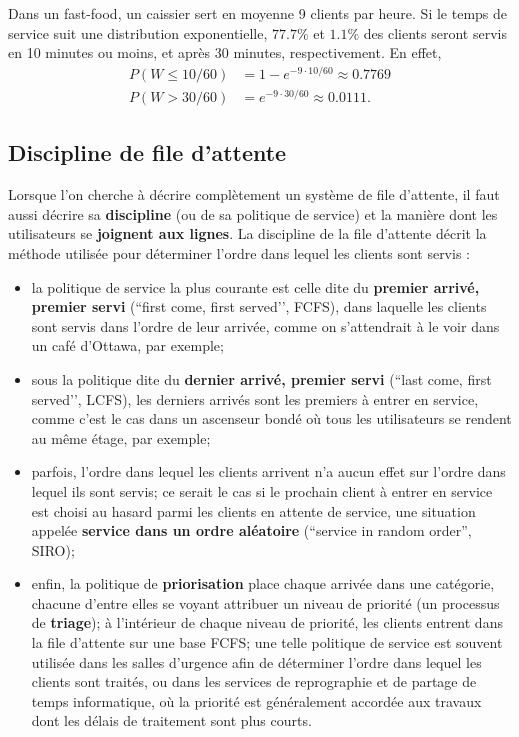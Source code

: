\begin{Example}
 Dans un fast-food, un caissier sert en moyenne 9 clients par heure. Si le temps de service suit une distribution exponentielle, $77.7\%$ et $1.1\%$ des clients seront servis en 10 minutes ou moins, et après 30 minutes, respectivement. En effet, \begin{align*}P(W\leq 10/60)&=1-e^{-9 \cdot 10/60} \approx 0.7769\\ P(W>30/60)&=e^{-9\cdot 30/60}\approx 0.0111.\end{align*}
\end{Example}

\subsection{Discipline de file d'attente}
Lorsque l’on cherche à décrire complètement un système de file d'attente, il faut aussi décrire sa \textbf{discipline} (ou de sa politique de service) et la manière dont les utilisateurs se  \textbf{joignent aux lignes}. La discipline de la file d'attente décrit la méthode utilisée pour déterminer l'ordre dans lequel les clients sont servis : 
\begin{itemize}
\item la politique de service la plus courante est celle dite du \textbf{premier arrivé, premier servi} (``first come, first served’’, FCFS), dans laquelle les clients sont servis dans l'ordre de leur arrivée, comme on s'attendrait à le voir dans un café d’Ottawa, par exemple;
\item sous la politique dite du \textbf{dernier arrivé, premier servi} (``last come, first served’’, LCFS), les derniers arrivés sont les premiers à entrer en service, comme c’est le cas dans un ascenseur bondé où tous les utilisateurs se rendent au même étage, par exemple;
\item parfois, l'ordre dans lequel les clients arrivent n'a aucun effet sur l'ordre dans lequel ils sont servis; ce serait le cas si le prochain client à entrer en service est choisi au hasard parmi les clients en attente de service, une situation appelée \textbf{service dans un ordre aléatoire} (``service in random order'', SIRO); 
\item enfin, la politique de \textbf{priorisation} place chaque arrivée dans une catégorie, chacune d'entre elles se voyant attribuer un niveau de priorité (un processus de \textbf{triage}); à l'intérieur de chaque niveau de priorité, les clients entrent dans la file d'attente sur une base FCFS; une telle politique de service est souvent utilisée dans les salles d'urgence afin de déterminer l'ordre dans lequel les clients sont traités, ou dans les services de reprographie et de partage de temps informatique, où la priorité est généralement accordée aux travaux dont les délais de traitement sont plus courts.
\end{itemize}

